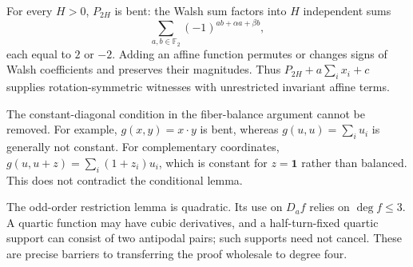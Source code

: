 \documentclass[11pt,a4paper]{article}
\newcommand{\F}{\mathbb F_2}
\newcommand{\one}{\mathbf1}
\begin{document}
For every $H>0$, $P_{2H}$ is bent: the Walsh sum factors into $H$ independent sums
\[
 \sum_{a,b\in\F}(-1)^{ab+\alpha a+\beta b},
\]
each equal to $2$ or $-2$. Adding an affine function permutes or changes signs of Walsh coefficients and preserves their magnitudes. Thus $P_{2H}+a\sum_i x_i+c$ supplies rotation-symmetric witnesses with unrestricted invariant affine terms.

The constant-diagonal condition in the fiber-balance argument cannot be removed. For example, $g(x,y)=x\cdot y$ is bent, whereas $g(u,u)=\sum_i u_i$ is generally not constant. For complementary coordinates, $g(u,u+z)=\sum_i(1+z_i)u_i$, which is constant for $z=\one$ rather than balanced. This does not contradict the conditional lemma.

The odd-order restriction lemma is quadratic. Its use on $D_af$ relies on $\deg f\le3$. A quartic function may have cubic derivatives, and a half-turn-fixed quartic support can consist of two antipodal pairs; such supports need not cancel. These are precise barriers to transferring the proof wholesale to degree four.
\end{document}
